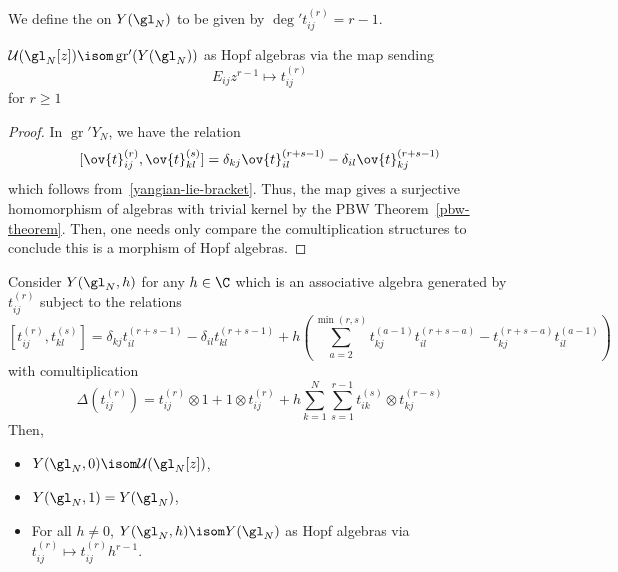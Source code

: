 \documentclass[11pt,leqno,oneside]{amsbook}
\numberwithin{thm}{section}
\newcommand{\U}{\mathcal{U}}
\newcommand{\associatedGraded}{\operatorname{gr}}
\begin{document}
\begin{defn}
  We define the  on \(Y(\gl_N)\) to be given by 
  \(\deg' t_{ij}^{(r)} = r-1\). 
\end{defn}
\begin{prop}
  \(\U(\gl_N[z]) \isom \associatedGraded'(Y(\gl_N))\) as Hopf algebras
  via the map sending \[
    E_{ij} z^{r-1} \mapsto t_{ij}^{(r)}
  \]
  for \(r \geq 1\)
\end{prop}
\begin{proof}
  In \(\associatedGraded' Y_N\), we have the relation
  \[ [\ov{t}_{ij}^{(r)}, \ov{t}_{kl}^{(s)}] = \delta_{kj}
    \ov{t}_{il}^{(r+s-1)} - \delta_{il}\ov{t}_{kj}^{(r+s-1)}
  \]
  which follows from~\ref{yangian-lie-bracket}. Thus, the map gives a
  surjective homomorphism of algebras with trivial kernel by the PBW
  Theorem~\ref{pbw-theorem}. Then, one needs only compare the
  comultiplication structures to conclude this is a morphism of Hopf
  algebras. 
\end{proof}
\begin{rmk}
  Consider \(Y(\gl_N,h)\) for any \(h \in \C\) which is an associative
  algebra generated by \(t_{ij}^{(r)}\) subject to the relations \[
    [t_{ij}^{(r)}, t_{kl}^{(s)}] = \delta_{kj} t_{il}^{(r+s-1)} -
    \delta_{il}t_{kl}^{(r+s-1)} + h\left( \sum_{a=2}^{\min(r,s)}
      t_{kj}^{(a-1)} t_{il}^{(r+s-a)} - t_{kj}^{(r+s-a)}t_{il}^{(a-1)} \right)
  \]
  with comultiplication \[
    \Delta(t_{ij}^{(r)}) = t_{ij}^{(r)} \otimes 1 + 1 \otimes
    t_{ij}^{(r)} + h \sum_{k=1}^N \sum_{s=1}^{r-1} t_{ik}^{(s)}
    \otimes t_{kj}^{(r-s)}
  \]
  Then,
  \begin{itemize}
  \item \(Y(\gl_N,0) \isom \U(\gl_N[z])\),
  \item \(Y(\gl_N,1) = Y(\gl_N)\), 
  \item For all \(h \neq 0\), \(Y(\gl_N,h) \isom Y(\gl_N)\) as Hopf
    algebras via \(t_{ij}^{(r)} \mapsto t_{ij}^{(r)} h^{r-1}\).
  \end{itemize}
\end{rmk}
\end{document}
